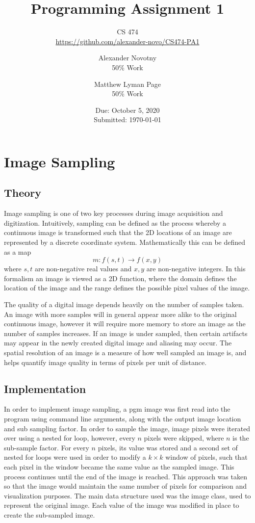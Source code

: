 \documentclass[headings=optiontoheadandtoc,listof=totoc,parskip=full]{scrartcl}
\title{Programming Assignment 1}
\subtitle{CS 474\\\url{https://github.com/alexander-novo/CS474-PA1}}
\author{Alexander Novotny\\50\% Work \and Matthew Lyman Page\\50\% Work}
\date{Due: October 5, 2020 \\ Submitted: \today}
\begin{document}
\maketitle
\tableofcontents
{}

\newpage
{}

\section{Image Sampling}

\subsection{Theory}
Image sampling is one of two key processes during image acquisition and digitization. Intuitively, sampling can be defined as the process whereby a continuous image is transformed such that the 2D locations of an image are represented by a discrete coordinate system. Mathematically this can be defined as a map \[
	m:f(s, t) \rightarrow f(x, y)
\]where $s, t$ are non-negative real values and $x, y$ are non-negative integers. In this formalism an image is viewed as a 2D function, where the domain defines the location of the image and the range defines the possible pixel values of the image.

The quality of a digital image depends heavily on the number of samples taken. An image with more samples will in general appear more alike to the original continuous image, however it will require more memory to store an image as the number of samples increases. If an image is under sampled, then certain artifacts may appear in the newly created digital image and aliasing may occur. The spatial resolution of an image is a measure of how well sampled an image is, and helps quantify image quality in terms of pixels per unit of distance.

\subsection{Implementation}
In order to implement image sampling, a pgm image was first read into the program using command line arguments, along with the output image location and sub sampling factor. In order to sample the image, image pixels were iterated over using a nested for loop, however, every $n$ pixels were skipped, where $n$ is the sub-sample factor. For every $n$ pixels, its value was stored and a second set of nested for loops were used in order to modify a $k \times k$ window of pixels, such that each pixel in the window became the same value as the sampled image. This process continues until the end of the image is reached. This approach was taken so that the image would maintain the same number of pixels for comparison and visualization purposes. The main data structure used was the image class, used to represent the original image. Each value of the image was modified in place to create the sub-sampled image.
\end{document}
